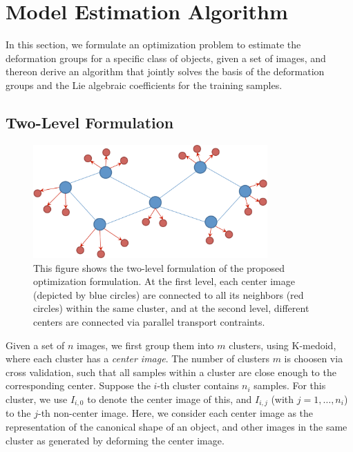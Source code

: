 
\section{Model Estimation Algorithm}
\label{sec:algorithm}

In this section, we formulate an optimization problem to estimate the
deformation groups for a specific class of objects, given a set of
images, and thereon derive an algorithm that jointly solves the basis
of the deformation groups and the Lie algebraic coefficients for the
training samples. 

\subsection{Two-Level Formulation}

\begin{figure}[t]
    \centering
    \includegraphics[width=0.8\textwidth]{pt_show.pdf}
    \caption{This figure shows the two-level formulation of the
      proposed optimization formulation. At the first level, each
      center image (depicted by blue circles) are connected to all its
    neighbors (red circles) within the same cluster, and at the second level,
    different centers are connected via parallel transport
    contraints. }
    \label{fig:pt_show}
\end{figure}


Given a set of $n$ images, we first group them into
$m$ clusters, using K-medoid, where each cluster has a \emph{center
  image}. The number of clusters $m$ is choosen via cross validation,
such that all samples within a cluster are close enough to the
corresponding center.
Suppose the $i$-th cluster contains $n_i$ samples. For this cluster, 
we use $I_{i,0}$ to denote the center image of this, and $I_{i,j}$
(with $j = 1, \ldots, n_i$) to the $j$-th non-center image. 
%
Here, we consider each center image as the representation of the canonical
shape of an object, and other images in the same cluster as generated
by deforming the center image.

